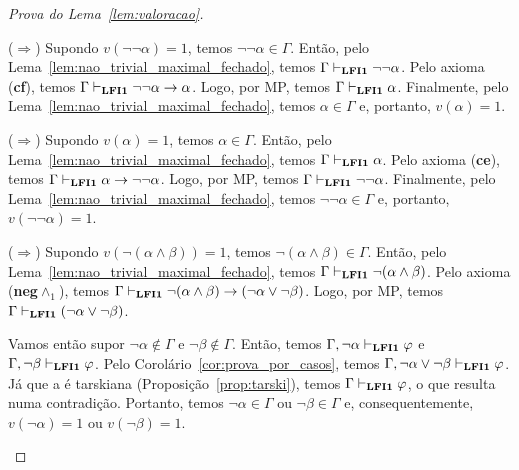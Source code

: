 \begin{proof}[Prova do Lema~\ref{lem:valoracao}]
\begin{provaporcasos}
\begin{adjustwidth}{1cm}{}
                        \end{adjustwidth}


                        \begin{adjustwidth}{1cm}{}
                            
                            \noindent ($\Longrightarrow$) Supondo $v(\neg \neg \alpha) = 1$, temos $\neg \neg \alpha \in \Gamma$. Então, pelo Lema~\ref{lem:nao_trivial_maximal_fechado}, temos $\Gamma \vdash_{{\normalfont\textbf{LFI1}}{}} \neg \neg \alpha$. Pelo axioma (\textbf{cf}), temos $\Gamma \vdash_{{\normalfont\textbf{LFI1}}{}} \neg \neg \alpha \to \alpha$. Logo, por MP, temos $\Gamma \vdash_{{\normalfont\textbf{LFI1}}{}} \alpha$. Finalmente, pelo Lema~\ref{lem:nao_trivial_maximal_fechado}, temos $\alpha \in \Gamma$ e, portanto, $v(\alpha) = 1$.

                            \noindent ($\Longrightarrow$) Supondo $v(\alpha) = 1$, temos $\alpha \in \Gamma$. Então, pelo Lema~\ref{lem:nao_trivial_maximal_fechado}, temos $\Gamma \vdash_{{\normalfont\textbf{LFI1}}{}} \alpha$. Pelo axioma (\textbf{ce}), temos $\Gamma \vdash_{{\normalfont\textbf{LFI1}}{}} \alpha \to \neg \neg \alpha$. Logo, por MP, temos $\Gamma \vdash_{{\normalfont\textbf{LFI1}}{}} \neg \neg \alpha$. Finalmente, pelo Lema~\ref{lem:nao_trivial_maximal_fechado}, temos $\neg \neg \alpha \in \Gamma$ e, portanto, $v(\neg \neg \alpha) = 1$.

                        \end{adjustwidth}


                        \begin{adjustwidth}{1cm}{}
                            
                            \noindent ($\Longrightarrow$) Supondo $v(\neg (\alpha \land \beta)) = 1$, temos $\neg (\alpha \land \beta) \in \Gamma$. Então, pelo Lema~\ref{lem:nao_trivial_maximal_fechado}, temos $\Gamma \vdash_{{\normalfont\textbf{LFI1}}{}} \neg (\alpha \land \beta)$. Pelo axioma (\textbf{neg}$\land_1$), temos $\Gamma \vdash_{{\normalfont\textbf{LFI1}}{}} \neg (\alpha \land \beta) \to (\neg \alpha \lor \neg \beta)$. Logo, por MP, temos $\Gamma \vdash_{{\normalfont\textbf{LFI1}}{}} (\neg \alpha \lor \neg \beta)$.

                            \noindent Vamos então supor $\neg \alpha \not \in \Gamma$ e $\neg \beta \not \in \Gamma$. Então, temos $\Gamma, \neg \alpha \vdash_{{\normalfont\textbf{LFI1}}{}} \varphi$ e $\Gamma, \neg \beta \vdash_{{\normalfont\textbf{LFI1}}{}} \varphi$. Pelo Corolário~\ref{cor:prova_por_casos}, temos $\Gamma, \neg \alpha \lor \neg \beta \vdash_{{\normalfont\textbf{LFI1}}{}} \varphi$. Já que a \lfium{} é tarskiana (Proposição~\ref{prop:tarski}), temos $\Gamma \vdash_{{\normalfont\textbf{LFI1}}{}} \varphi$, o que resulta numa contradição. Portanto, temos $\neg \alpha \in \Gamma$ ou $\neg \beta \in \Gamma$ e, consequentemente, $v(\neg \alpha) = 1$ ou $v(\neg \beta) = 1$.
                            

\end{adjustwidth}
\end{provaporcasos}
\end{proof}
